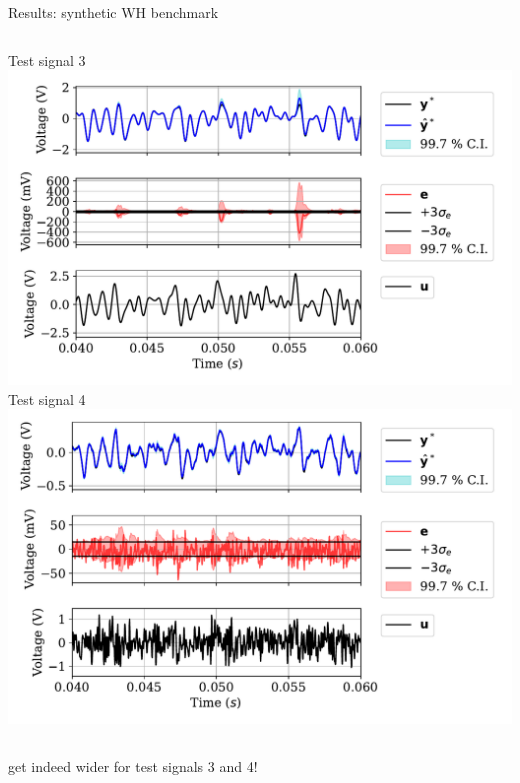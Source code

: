 \documentclass{beamer}
\begin{document}
\begin{frame}{Results: synthetic WH benchmark}
\begin{columns}
\centering
\alert{Test signal 3}
\includegraphics[width=.9\textwidth]{img/uncertainty/MULTISINE_3.pdf}
\centering
\alert{Test signal 4}
\includegraphics[width=.9\textwidth]{img/uncertainty/MULTISINE_4.pdf}
\end{columns}
 get indeed wider for test signals 3 and 4!
\end{frame}
\end{document}
